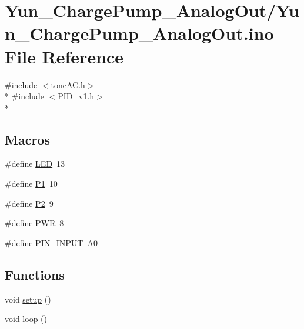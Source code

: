 \hypertarget{Yun__ChargePump__AnalogOut_8ino}{\section{Yun\-\_\-\-Charge\-Pump\-\_\-\-Analog\-Out/\-Yun\-\_\-\-Charge\-Pump\-\_\-\-Analog\-Out.ino File Reference}
\label{Yun__ChargePump__AnalogOut_8ino}
}
{\ttfamily \#include $<$tone\-A\-C.\-h$>$}\\*
{\ttfamily \#include $<$P\-I\-D\-\_\-v1.\-h$>$}\\*
\subsection*{Macros}
\begin{DoxyCompactItemize}
\item 
\#define \hyperlink{Yun__ChargePump__AnalogOut_8ino_aeb7a7ba1ab7e0406f1b5ab36d579f585}{L\-E\-D}~13
\item 
\#define \hyperlink{Yun__ChargePump__AnalogOut_8ino_a6c2a9f7efd46f0160f3037869924d6ce}{P1}~10
\item 
\#define \hyperlink{Yun__ChargePump__AnalogOut_8ino_ae00a52dba55d31948c377fa85d385b87}{P2}~9
\item 
\#define \hyperlink{Yun__ChargePump__AnalogOut_8ino_a04651c526497822a859942b928e57f8e}{P\-W\-R}~8
\item 
\#define \hyperlink{Yun__ChargePump__AnalogOut_8ino_a5a94a90bd5b33109a2e3832760bc5da1}{P\-I\-N\-\_\-\-I\-N\-P\-U\-T}~A0
\end{DoxyCompactItemize}
\subsection*{Functions}
\begin{DoxyCompactItemize}
\item 
void \hyperlink{Yun__ChargePump__AnalogOut_8ino_a4fc01d736fe50cf5b977f755b675f11d}{setup} ()
\item 
void \hyperlink{Yun__ChargePump__AnalogOut_8ino_afe461d27b9c48d5921c00d521181f12f}{loop} ()
\end{DoxyCompactItemize}
